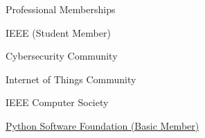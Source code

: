 
\begin{rBulletSection}[2]{Professional Memberships}

    \item IEEE (Student Member)

    \begin{rBulletList}

      \item Cybersecurity Community

      \item Internet of Things Community

    \end{rBulletList}

    \item IEEE Computer Society

    \item \href{https://www.python.org/users/mmabey/}{Python Software Foundation (Basic Member)}

\end{rBulletSection}
